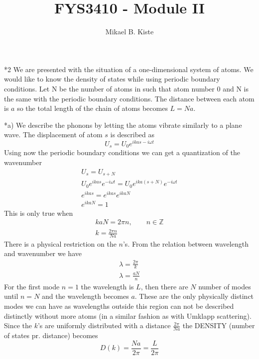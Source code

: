 \documentclass[a4paper]{article}
\author{Mikael B. Kiste}
\title{FYS3410 - Module II}
\begin{document}
\maketitle

\begin{section}*2
We are presented with the situation of a one-dimensional system of atoms. We would like to know the density of states while using periodic boundary conditions. Let N be the number of atoms in such that atom number 0 and N is the same with the periodic boundary conditions. The distance between each atom is $a$ so the total length of the chain of atoms becomes $L=Na$.
	\begin{subsection}*{a)}
		We describe the phonons by letting the atoms vibrate similarly to a plane wave. The displacement of atom $s$ is described as 
		$$ U_s = U_0 e^{ikas-i\omega t} $$
		Using now the periodic boundary conditions we can get a quantization of the wavenumber
		\begin{align*}
			U_s = U_{s+N}\\
			U_0e^{ikas}e^{-i\omega t} = U_0e^{ika(s+N)}e^{-i\omega t}\\
			e^{ikas} = e^{ikas}e^{ikaN}\\
			e^{ikaN} = 1
		\end{align*}
		This is only true when
		\begin{align*}
			kaN=2 \pi n,\qquad n\in \mathbb{Z}\\
			k = \frac{2\pi n}{Na}
		\end{align*}
		There is a physical restriction on the $n$'s. From the relation between wavelength and wavenumber we have
		\begin{align*}
			\lambda = \frac{2\pi}{k}\\
			\lambda = \frac{aN}{n}
		\end{align*}
		For the first mode $n=1$ the wavelength is $L$, then there are $N$ number of modes until $n=N$ and the wavelength becomes $a$. These are the only physically distinct modes we can have as wavelengths outside this region can not be described distinctly without more atoms (in a similar fashion as with Umklapp scattering).
		Since the $k$'s are uniformly distributed with a distance $\frac{2\pi}{Na}$ the DENSITY (number of states pr. distance) becomes
		$$D(k) = \frac{Na}{2\pi} = \frac{L}{2\pi}$$


\end{subsection}
\end{section}
\end{document}
